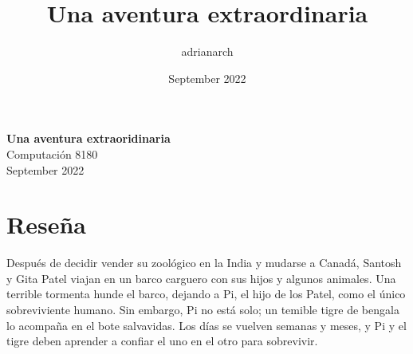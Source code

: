\documentclass[a5 paper, 11pt]{article}
\title{Una aventura extraordinaria}
\author{adrianarch }
\date{September 2022}
\begin{document}
\begin{center}

\Huge{\textbf{Una aventura extraoridinaria}}\\
\huge{Computación 8180\\
September 2022}
\end{center}


\section{Reseña}
Después de decidir vender su zoológico en la India y mudarse a Canadá, Santosh y Gita Patel viajan en un barco carguero con sus hijos y algunos animales. Una terrible tormenta hunde el barco, dejando a Pi, el hijo de los Patel, como el único sobreviviente humano. Sin embargo, Pi no está solo; un temible tigre de bengala lo acompaña en el bote salvavidas. Los días se vuelven semanas y meses, y Pi y el tigre deben aprender a confiar el uno en el otro para sobrevivir.
\end{document}
